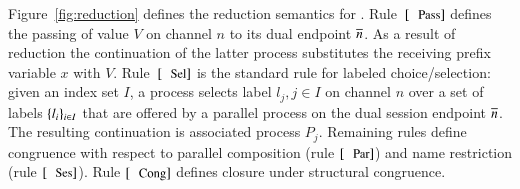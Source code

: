 

\noi Figure~\ref{fig:reduction} defines
the reduction semantics for \HOp.
Rule~$\orule{Pass}$ defines the passing
of value $V$ on channel $n$ to its dual endpoint $\overline{n}$.
As a result of reduction the continuation of the 
latter process substitutes the receiving prefix variable $x$
with $V$.
Rule~$\orule{Sel}$ is the standard rule for labeled choice/selection:
given an index set $I$, 
a process selects label $l_j, j \in I$ on channel $n$ over a set of
labels $\{l_i\}_{i \in I}$ that are offered by a parallel process
on the dual session endpoint $\overline{n}$.
The resulting continuation is associated process $P_j$.
Remaining rules define congruence 
with respect to parallel composition (rule $\orule{Par}$)
and name restriction (rule $\orule{Ses}$).
Rule $\orule{Cong}$ defines closure under structural congruence.


